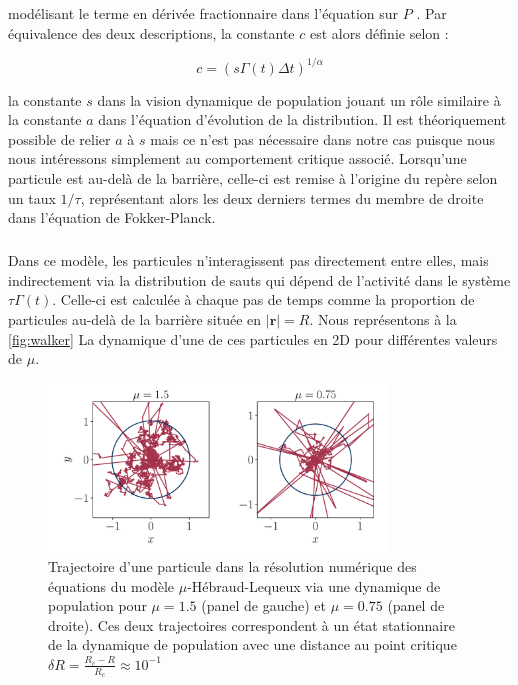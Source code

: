 \noindent modélisant le terme en dérivée fractionnaire dans l'équation sur $P$ \cite{hinrichsen_non_equilibrium_2007, jespersen_levy_1999}. Par équivalence des deux descriptions, la constante $c$ est alors définie selon :

\begin{equation}
	c = \left( s \Gamma(t) \Delta t \right)^{1/\alpha}
\end{equation}

\noindent la constante $s$ dans la vision dynamique de population jouant un rôle similaire à la constante $a$ dans l'équation d'évolution de la distribution. Il est théoriquement possible de relier $a$ à $s$ mais ce n'est pas nécessaire dans notre cas puisque nous nous intéressons simplement au comportement critique associé. Lorsqu'une particule est au-delà de la barrière, celle-ci est remise à l'origine du repère selon un taux $1/\tau$, représentant alors les deux derniers termes du membre de droite dans l'équation de Fokker-Planck.

\subparagraph{}Dans ce modèle, les particules n'interagissent pas directement entre elles, mais indirectement via la distribution de sauts qui dépend de l'activité dans le système $\tau\Gamma (t)$. Celle-ci est calculée à chaque pas de temps comme la proportion de particules au-delà de la barrière située en $|\mathbf{r}|=R$. Nous représentons à la \autoref{fig:walker} La dynamique d'une de ces particules en 2D pour différentes valeurs de $\mu$.

\begin{figure}[h]
	\centering
	\includegraphics[width= 0.8\textwidth]{walker.pdf}
	\caption{Trajectoire d'une particule dans la résolution numérique des équations du modèle $\mu$-Hébraud-Lequeux via une dynamique de population pour $\mu = 1.5$ (panel de gauche) et $\mu = 0.75$ (panel de droite). Ces deux trajectoires correspondent à un état stationnaire de la dynamique de population avec une distance au point critique $\delta R = \frac{R_c-R}{R_c}\approx 10^{-1}$}
	 \label{fig:walker}
\end{figure}

